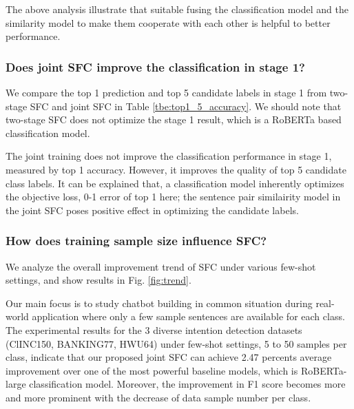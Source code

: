 \documentclass[letterpaper]{article} %
\begin{document}
  The above analysis illustrate that suitable fusing the classification model and the 
  similarity model to make them cooperate with each other is helpful to better
  performance.  

  \subsubsection*{Does joint SFC improve the classification in stage 1?}
  We  compare  the  top  1  prediction and top 5 candidate labels in stage 1 from
  two-stage SFC and joint SFC in Table \ref{tbe:top1_5_accuracy}. We should note
  that  two-stage  SFC  does not optimize the stage 1 result, which is a RoBERTa
  based classification model.

  The joint training does not improve the classification performance in stage 1,
  measured  by  top  1  accuracy.  However,  it  improves  the  quality of top 5
  candidate  class  labels.  It  can  be  explained that, a classification model
  inherently optimizes the objective loss, 0-1 error of top 1 here; the sentence
  pair similairity model in the joint SFC poses positive effect in optimizing the 
  candidate labels.


  \subsubsection*{How does training sample size influence SFC?} 
  We analyze the overall  improvement  trend  of  SFC under various few-shot
  settings, and show results in Fig. \ref{fig:trend}.

  Our main focus  is  to  study  chatbot  building  in common situation during real-world
  application  where  only  a few sample sentences are available for each class.
  The  experimental  results  for  the  3  diverse  intention detection datasets
  (ClINC150,  BANKING77,  HWU64)  under  few-shot  settings, 5 to 50 samples per
  class,  indicate that our proposed joint SFC can achieve 2.47 percents average
  improvement   over  one  of  the  most  powerful  baseline  models,  which  is
  RoBERTa-large  classification  model.  Moreover,  the  improvement  in F1 score
  becomes  more  and  more prominent with the decrease of data sample number per
  class.
\end{document}
